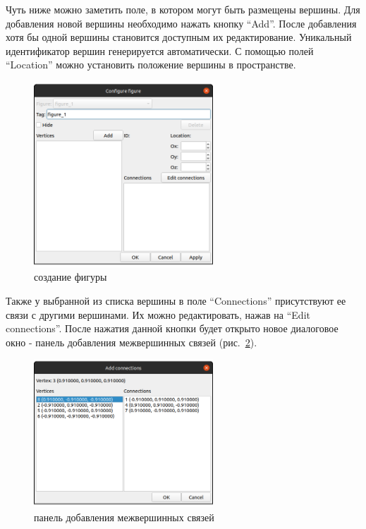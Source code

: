 \documentclass[12pt, a4paper, hidelinks]{article}
\begin{document}
Чуть ниже можно заметить поле, в котором могут быть размещены вершины. Для добавления новой вершины необходимо нажать кнопку \enquote{Add}. После добавления хотя бы одной вершины становится доступным их редактирование. Уникальный идентификатор вершин генерируется автоматически. С помощью полей \enquote{Location} можно установить положение вершины в пространстве.
\begin{figure}[htbp!]
	\centering
	\includegraphics[width=0.6\textwidth]{images/figurecfgnew.png}
	\caption{создание фигуры}
	\label{figure_cfg_new}
\end{figure}

Также у выбранной из списка вершины в поле \enquote{Connections} присутствуют ее связи с другими вершинами. Их можно редактировать, нажав на \enquote{Edit connections}. После нажатия данной кнопки будет открыто новое диалоговое окно - панель добавления межвершинных связей (рис.~\ref{add_connections}).

\begin{figure}[htbp!]
	\centering
	\includegraphics[width=0.6\textwidth]{images/addconnections.png}
	\caption{панель добавления межвершинных связей}
	\label{add_connections}
\end{figure}
\end{document}
